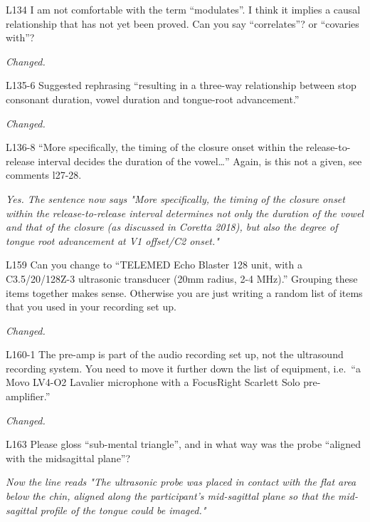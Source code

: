 \documentclass[]{article}
\begin{document}
L134 I am not comfortable with the term ``modulates''. I think it
implies a causal relationship that has not yet been proved. Can you say
``correlates''? or ``covaries with''?

\begin{adjustwidth}{1cm}{} \textit{
Changed.
} \end{adjustwidth}

L135-6 Suggested rephrasing ``resulting in a three-way relationship
between stop consonant duration, vowel duration and tongue-root
advancement.''

\begin{adjustwidth}{1cm}{} \textit{
Changed.
} \end{adjustwidth}

L136-8 ``More specifically, the timing of the closure onset within the
release-to-release interval decides the duration of the vowel\ldots{}''
Again, is this not a given, see comments l27-28.

\begin{adjustwidth}{1cm}{} \textit{
Yes. The sentence now says "More specifically, the timing of the closure onset within the release-to-release interval determines not only the duration of the vowel and that of the closure (as discussed in Coretta 2018), but also the degree of tongue root advancement at V1 offset/C2 onset."
} \end{adjustwidth}

L159 Can you change to ``TELEMED Echo Blaster 128 unit, with a
C3.5/20/128Z-3 ultrasonic transducer (20mm radius, 2-4 MHz).'' Grouping
these items together makes sense. Otherwise you are just writing a
random list of items that you used in your recording set up.

\begin{adjustwidth}{1cm}{} \textit{
Changed.
} \end{adjustwidth}

L160-1 The pre-amp is part of the audio recording set up, not the
ultrasound recording system. You need to move it further down the list
of equipment, i.e.~``a Movo LV4-O2 Lavalier microphone with a FocusRight
Scarlett Solo pre-amplifier.''

\begin{adjustwidth}{1cm}{} \textit{
Changed.
} \end{adjustwidth}

L163 Please gloss ``sub-mental triangle'', and in what way was the probe
``aligned with the midsagittal plane''?

\begin{adjustwidth}{1cm}{} \textit{
Now the line reads "The ultrasonic probe was placed in contact with the flat area below the chin, aligned along the participant's mid-sagittal plane so that the mid-sagittal profile of the tongue could be imaged."
} \end{adjustwidth}
\end{document}

